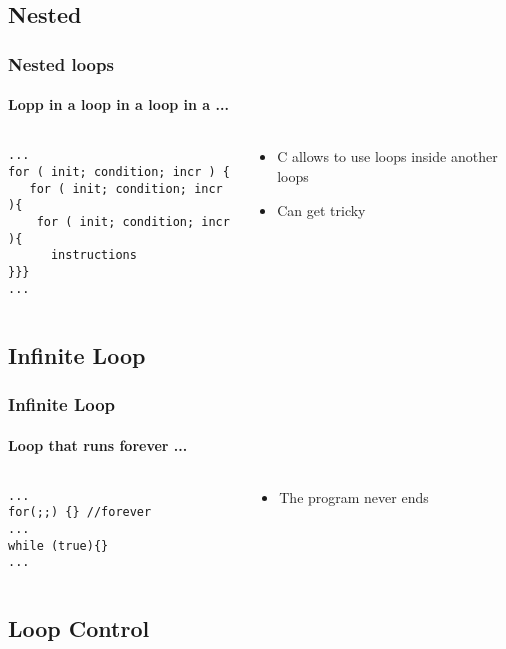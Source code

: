 \documentclass[10pt]{beamer}
\begin{document}
\subsection{Nested}

\begin{frame}[fragile]
  \frametitle{Nested loops}
  \framesubtitle{Lopp in a loop in a loop in a ...}
  \begin{columns}
    \begin{column}{0.6\textwidth}
\begin{lstlisting}
...
for ( init; condition; incr ) {
   for ( init; condition; incr ){
    for ( init; condition; incr ){
      instructions
}}}
...
\end{lstlisting}
    \end{column}
    \begin{column}{0.5\textwidth}
    \begin{itemize}
      \item C allows to use loops inside another loops
      \item Can get tricky
    \end{itemize}
    \end{column}
  \end{columns}
\end{frame}

\subsection{Infinite Loop}

\begin{frame}[fragile]
  \frametitle{Infinite Loop}
  \framesubtitle{Loop that runs forever ...}
  \begin{columns}
    \begin{column}{0.6\textwidth}
\begin{lstlisting}
...
for(;;) {} //forever
...
while (true){}
...
\end{lstlisting}
    \end{column}
    \begin{column}{0.5\textwidth}
    \begin{itemize}
      \item The program never ends
    \end{itemize}
    \end{column}
  \end{columns}
\end{frame}

\subsection{Loop Control}
\end{document}
